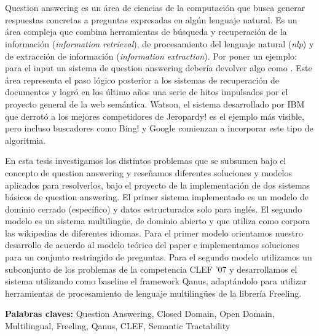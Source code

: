 \chapter*{\runtitulo}
Question answering es un área de ciencias de la computación que busca generar respuestas concretas a preguntas expresadas en algún lenguaje natural. Es un área compleja que combina herramientas de búsqueda y recuperación de la información (\textit{information retrieval}), de procesamiento del lenguaje natural (\textit{nlp}) y de extracción de información (\textit{information extraction}). Por poner un ejemplo: para el input \textit{} un sistema de question answering debería devolver algo como .
Este área representa el paso lógico posterior a los sistemas de recuperación de documentos y logró en los último años una serie de hitos impulsados por el proyecto general de la web semántica. Watson, el sistema desarrollado por IBM que derrotó a los mejores competidores de Jeropardy! es el ejemplo más visible, pero incluso buscadores como Bing! y Google comienzan a incorporar este tipo de algoritmia.

En esta tesis investigamos los distintos problemas que se subsumen bajo el concepto de question answering y reseñamos diferentes soluciones y modelos aplicados para resolverlos, bajo el proyecto de la implementación de dos sistemas básicos de question answering. El primer sistema implementado es un modelo de dominio cerrado (específico) y datos estructurados solo para inglés. El segundo modelo es un sistema multilingüe, de dominio abierto y que utiliza como corpora las wikipedias de diferentes idiomas. Para el primer modelo orientamos nuestro desarrollo de acuerdo al modelo teórico del paper \cite{QADB1} e implementamos soluciones para un conjunto restringido de preguntas.  Para el segundo modelo utilizamos  un subconjunto de los problemas de la competencia CLEF '07 y desarrollamos el sistema utilizando como baseline el framework Qanus, adaptándolo para utilizar herramientas de procesamiento de lenguaje multilingües de la librería Freeling.
\bigskip

\noindent\textbf{Palabras claves:} Question Answering, Closed Domain, Open Domain, Multilingual, Freeling, Qanus, CLEF, Semantic Tractability